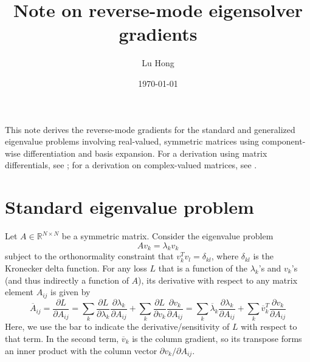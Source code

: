 \documentclass[11pt, a4paper]{article}
\title{Note on reverse-mode eigensolver gradients}
\author{Lu Hong}
\date{\today}
\begin{document}
\maketitle

This note derives the reverse-mode gradients for the standard and generalized eigenvalue problems involving real-valued, symmetric matrices using component-wise differentiation and basis expansion. For a derivation using matrix differentials, see \cite{giles8extended}; for a derivation on complex-valued matrices, see \cite{boeddeker2019computationcomplexvaluedgradientsapplication,jackd_complex_eigs}.

\section{Standard eigenvalue problem}

Let $A\in\mathbb R^{N\times N}$ be a symmetric matrix. Consider the eigenvalue problem
\begin{equation}
    Av_k=\lambda_k v_k
    \label{eig}
\end{equation}
subject to the orthonormality constraint that $v_k^Tv_l=\delta_{kl}$, where $\delta_{kl}$ is the Kronecker delta function. For any loss $L$ that is a function of the $\lambda_k$'s and $v_k$'s (and thus indirectly a function of $A$), its derivative with respect to any matrix element $A_{ij}$ is given by
\begin{equation}
    \overline{A}_{ij} = \frac{\partial L}{\partial A_{ij}} = \sum_k\frac{\partial L}{\partial\lambda_k}\frac{\partial\lambda_k}{\partial A_{ij}} + \sum_k\frac{\partial L}{\partial v_k}\frac{\partial v_k}{\partial A_{ij}} = \sum_k \overline{\lambda}_k\frac{\partial\lambda_k}{\partial A_{ij}} + \sum_k \overline{v}_k^T\frac{\partial v_k}{\partial A_{ij}}
    \label{eig_der_expansion}
\end{equation}
Here, we use the bar to indicate the derivative/sensitivity of $L$ with respect to that term. In the second term, $\overline v_k$ is the column gradient, so its transpose forms an inner product with the column vector $\partial v_k/\partial A_{ij}$.
\end{document}
